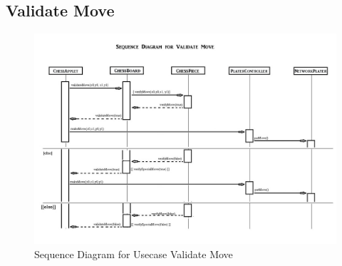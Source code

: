\subsection{Validate Move}
\begin{figure}[H]
   \centering
   \includegraphics[scale=0.50]{seq_Validate_Move.jpg}
   \caption{Sequence Diagram for Usecase Validate Move}
  \end{figure}

